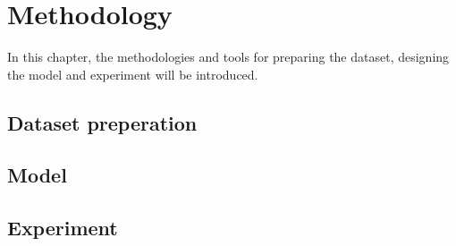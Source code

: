 \chapter{Methodology}
In this chapter, the methodologies and tools for preparing the dataset, designing the model and experiment will be introduced.
\section{Dataset preperation}
\section{Model}
\section{Experiment}